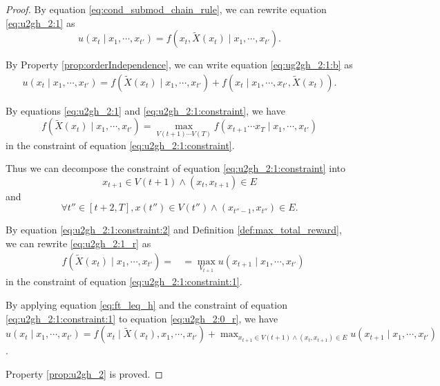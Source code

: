 \begin{proof}

By equation \eqref{eq:cond_submod_chain_rule}, we can rewrite equation \eqref{eq:u2gh_2:1} as
\begin{equation}
\label{eq:ug2gh_2:1:b}
u(x_{t} \mid x_{1} , \cdots , x_{t'} ) = f(x_{t}, \tilde{X}(x_{t}) \mid x_{1} , \cdots , x_{t'} ).
\end{equation}

By Property \ref{prop:orderIndependence}, we can write equation \eqref{eq:ug2gh_2:1:b} as
\begin{equation}
\label{eq:u2gh_2:0_r}
\begin{aligned}
u(x_{t} \mid x_{1} , \cdots , x_{t'} ) = 
f( \tilde{X}(x_{t}) \mid x_{1}, \cdots , x_{t'}) + f(x_{t} \mid x_{1}, \cdots , x_{t'}, \tilde{X}(x_{t})) .
\end{aligned}
\end{equation}

By equations \eqref{eq:u2gh_2:1} and \eqref{eq:u2gh_2:1:constraint}, we have
\begin{equation}
\label{eq:u2gh_2:1_r}
f( \tilde{X}(x_{t}) \mid x_{1}, \cdots , x_{t'}) = \max_{ V(t+1) \cdots V(T) } f( x_{t+1} \cdots x_{T} \mid x_{1} , \cdots , x_{t'} )
\end{equation}
in the constraint of equation \eqref{eq:u2gh_2:1:constraint}.

Thus we can decompose the constraint of equation \eqref{eq:u2gh_2:1:constraint} into
\begin{equation}
\label{eq:u2gh_2:1:constraint:1}
x_{t+1} \in V(t+1) \land ( x_{t}, x_{t+1} ) \in E
\end{equation}
and
\begin{equation}
\label{eq:u2gh_2:1:constraint:2}
\forall t'' \in [t+2, T], x(t'') \in V(t'') \land ( x_{t''-1}, x_{t''} ) \in E.
\end{equation}

By equation \eqref{eq:u2gh_2:1:constraint:2} and Definition \ref{def:max_total_reward}, we can rewrite \eqref{eq:u2gh_2:1_r} as
\begin{equation}
\label{eq:ft_leq_h}
\begin{aligned}
& f( \tilde{X}(x_{t}) \mid x_{1}, \cdots , x_{t'}) = 
& = \max_{V_{t+1}} u( x_{t+1} \mid x_{1} , \cdots , x_{t'} )
\end{aligned}
\end{equation}
in the constraint of equation \eqref{eq:u2gh_2:1:constraint:1}.

By applying equation \eqref{eq:ft_leq_h} and the constraint of equation \eqref{eq:u2gh_2:1:constraint:1} to equation \eqref{eq:u2gh_2:0_r}, we have
$ u( x_{t} \mid x_{1} , \cdots , x_{t'} ) = f( x_{t} \mid \tilde{X}(x_{t}), x_{1} , \cdots , x_{t'} ) +  \max_{x_{t+1} \in V(t+1) \land ( x_{t}, x_{t+1} ) \in E} u( x_{t+1} \mid x_{1} , \cdots , x_{t'} ) $.

Property \ref{prop:u2gh_2} is proved.

\end{proof}

